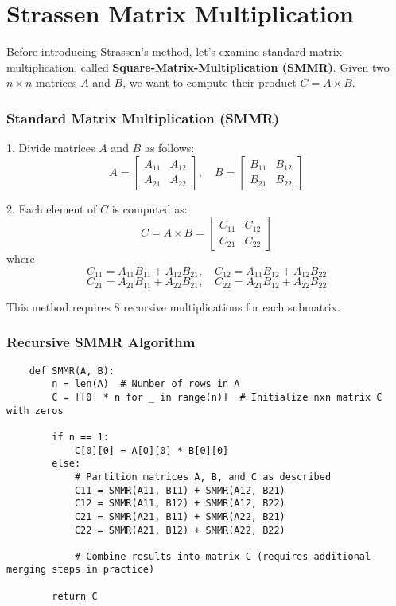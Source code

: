 \chapter{Strassen Matrix Multiplication}
    
    Before introducing Strassen's method, let's examine standard matrix multiplication, called \textbf{Square-Matrix-Multiplication (SMMR)}. Given two \(n \times n\) matrices \(A\) and \(B\), we want to compute their product \(C = A \times B\).
    
    \subsection{Standard Matrix Multiplication (SMMR)}
    1. Divide matrices \(A\) and \(B\) as follows:
       \[
       A = \begin{bmatrix} A_{11} & A_{12} \\ A_{21} & A_{22} \end{bmatrix}, \quad B = \begin{bmatrix} B_{11} & B_{12} \\ B_{21} & B_{22} \end{bmatrix}
       \]
       
    2. Each element of \(C\) is computed as:
       \[
       C = A \times B = \begin{bmatrix} C_{11} & C_{12} \\ C_{21} & C_{22} \end{bmatrix}
       \]
       where
       \[
       C_{11} = A_{11} B_{11} + A_{12} B_{21}, \quad C_{12} = A_{11} B_{12} + A_{12} B_{22}
       \]
       \[
       C_{21} = A_{21} B_{11} + A_{22} B_{21}, \quad C_{22} = A_{21} B_{12} + A_{22} B_{22}
       \]
    
    This method requires 8 recursive multiplications for each submatrix.
    
    \subsection{Recursive SMMR Algorithm}
    
    \begin{verbatim}
    def SMMR(A, B):
        n = len(A)  # Number of rows in A
        C = [[0] * n for _ in range(n)]  # Initialize nxn matrix C with zeros
        
        if n == 1:
            C[0][0] = A[0][0] * B[0][0]
        else:
            # Partition matrices A, B, and C as described
            C11 = SMMR(A11, B11) + SMMR(A12, B21)
            C12 = SMMR(A11, B12) + SMMR(A12, B22)
            C21 = SMMR(A21, B11) + SMMR(A22, B21)
            C22 = SMMR(A21, B12) + SMMR(A22, B22)
            
            # Combine results into matrix C (requires additional merging steps in practice)
        
        return C
    \end{verbatim}
    
